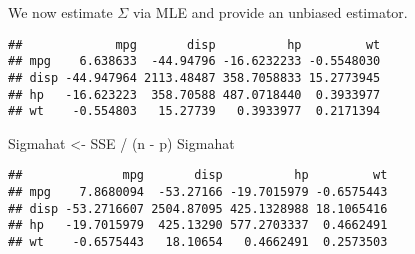 \documentclass[
  ignorenonframetext,
]{beamer}
\newenvironment{Shaded}{\begin{snugshade}}{\end{snugshade}}
\newcommand{\CommentTok}[1]{\textcolor[rgb]{0.56,0.35,0.01}{\textit{#1}}}
\newcommand{\FunctionTok}[1]{\textcolor[rgb]{0.00,0.00,0.00}{#1}}
\newcommand{\NormalTok}[1]{#1}
\newcommand{\OtherTok}[1]{\textcolor[rgb]{0.56,0.35,0.01}{#1}}
\newcommand{\SpecialCharTok}[1]{\textcolor[rgb]{0.00,0.00,0.00}{#1}}
\begin{document}
\begin{frame}[fragile]{}
\protect\hypertarget{section-1}{}
We now estimate \(\Sigma\) via MLE and provide an unbiased estimator.

\vspace{12pt}
\tiny

\begin{Shaded}
\end{Shaded}

\begin{verbatim}
##             mpg       disp          hp         wt
## mpg    6.638633  -44.94796 -16.6232233 -0.5548030
## disp -44.947964 2113.48487 358.7058833 15.2773945
## hp   -16.623223  358.70588 487.0718440  0.3933977
## wt    -0.554803   15.27739   0.3933977  0.2171394
\end{verbatim}

\begin{Shaded}
\begin{Highlighting}[]
\NormalTok{Sigmahat }\OtherTok{\textless{}{-}}\NormalTok{ SSE }\SpecialCharTok{/}\NormalTok{ (n }\SpecialCharTok{{-}}\NormalTok{ p)}
\NormalTok{Sigmahat}
\end{Highlighting}
\end{Shaded}

\begin{verbatim}
##              mpg       disp          hp         wt
## mpg    7.8680094  -53.27166 -19.7015979 -0.6575443
## disp -53.2716607 2504.87095 425.1328988 18.1065416
## hp   -19.7015979  425.13290 577.2703337  0.4662491
## wt    -0.6575443   18.10654   0.4662491  0.2573503
\end{verbatim}
\end{frame}
\end{document}
